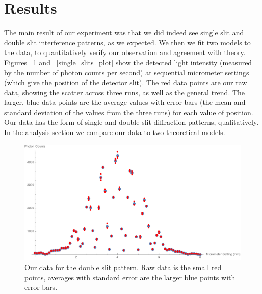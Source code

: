 \documentclass[prb,preprint]{revtex4-1}
\begin{document}
\section{Results}

The main result of our experiment was that we did indeed see single slit and double slit interference patterns, as we expected.  We then we fit two models to the data, to quantitatively verify our observation and agreement with theory.  Figures ~\ref{double_slit_plot} and ~\ref{single_slits_plot} show the detected light intensity (measured by the number of photon counts per second) at sequential micrometer settings (which give the position of the detector slit). The red data points are our raw data, showing the scatter across three runs, as well as the general trend. The larger, blue data points are the average values with error bars (the mean and standard deviation of the values from the three runs) for each value of position.  Our data has the form of single and double slit diffraction patterns, qualitatively.  In the analysis section we compare our data to two theoretical models. 

\begin{figure}[h!]
\centering
\includegraphics[width=6in]{double_slit_plot.pdf}
\caption{Our data for the double slit pattern.  Raw data is the small red points, averages with standard error are the larger blue points with error bars. }
\label{double_slit_plot}
\end{figure}
\end{document}
